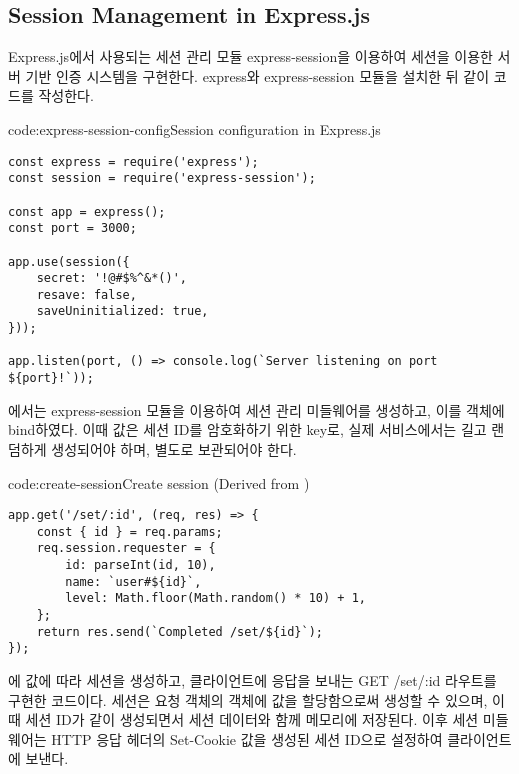 
\subsection*{Session Management in Express.js}

Express.js에서 사용되는 세션 관리 모듈 express-session을 이용하여 세션을 이용한 서버 기반 인증 시스템을 구현한다. express와 express-session 모듈을 설치한 뒤 \와 같이 코드를 작성한다.

\begin{code}{code:express-session-config}{Session configuration in Express.js}
\begin{verbatim}
const express = require('express');
const session = require('express-session');

const app = express();
const port = 3000;

app.use(session({
    secret: '!@#$%^&*()',
    resave: false,
    saveUninitialized: true,
}));

app.listen(port, () => console.log(`Server listening on port ${port}!`));
\end{verbatim}
\end{code}

에서는 express-session 모듈을 이용하여 세션 관리 미들웨어를 생성하고, 이를  객체에 bind하였다. 이때  값은 세션 ID를 암호화하기 위한 key로, 실제 서비스에서는 길고 랜덤하게 생성되어야 하며, 별도로 보관되어야 한다.

\begin{code}{code:create-session}{Create session (Derived from )}
\begin{verbatim}
app.get('/set/:id', (req, res) => {
    const { id } = req.params;
    req.session.requester = {
        id: parseInt(id, 10),
        name: `user#${id}`,
        level: Math.floor(Math.random() * 10) + 1,
    };
    return res.send(`Completed /set/${id}`);
});
\end{verbatim}
\end{code}

\은 에  값에 따라 세션을 생성하고, 클라이언트에 응답을 보내는 GET /set/:id 라우트를 구현한 코드이다. 세션은 요청 객체의  객체에 값을 할당함으로써 생성할 수 있으며, 이때 세션 ID가 같이 생성되면서 세션 데이터와 함께 메모리에 저장된다. 이후 세션 미들웨어는 HTTP 응답 헤더의 Set-Cookie 값을 생성된 세션 ID으로 설정하여 클라이언트에 보낸다.


